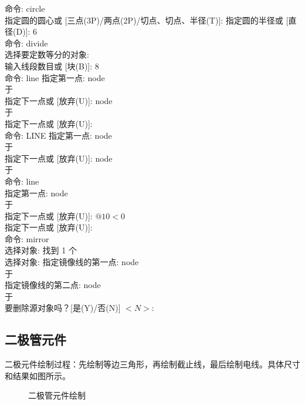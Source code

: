 \noindent
命令: circle\\
 指定圆的圆心或 [三点(3P)/两点(2P)/切点、切点、半径(T)]:
指定圆的半径或 [直径(D)]: 6\\
命令: divide\\
选择要定数等分的对象:\\
输入线段数目或 [块(B)]: 8\\
命令: line 指定第一点: node\\
于\\
指定下一点或 [放弃(U)]: node\\
于\\
指定下一点或 [放弃(U)]:\\
命令:  LINE 指定第一点: node\\
于\\
指定下一点或 [放弃(U)]: node\\
于\\
命令: line\\
指定第一点: node\\
于\\
指定下一点或 [放弃(U)]: $@10<0$\\
指定下一点或 [放弃(U)]:\\
命令: mirror\\
选择对象: 找到 1 个\\
选择对象:  指定镜像线的第一点: node\\
于\\
指定镜像线的第二点: node\\
于\\
要删除源对象吗？[是(Y)/否(N)] $<N>:$
\subsection{二极管元件}
二极元件绘制过程：先绘制等边三角形，再绘制截止线，最后绘制电线。具体尺寸和结果如图所示。

\noindent
\begin{figure}[htbp]
\centering
{}\hspace{30pt}
\caption{二极管元件绘制}
\end{figure}

